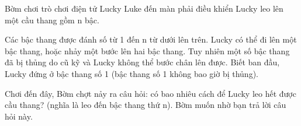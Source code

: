 Bờm chơi trò chơi điện tử Lucky Luke đến màn phải điều khiển Lucky leo lên một cầu thang gồm n bậc.

Các bậc thang được đánh số từ 1 đến n từ dưới lên trên. Lucky có thể đi lên một bậc thang, hoặc nhảy một bước lên hai bậc thang. Tuy nhiên một số bậc thang đã bị thủng do cũ kỹ và Lucky không thể bước chân lên được. Biết ban đầu, Lucky đứng ở bậc thang số 1 (bậc thang số 1 không bao giờ bị thủng).

Chơi đến đây, Bờm chợt nảy ra câu hỏi: có bao nhiêu cách để Lucky leo hết được cầu thang? (nghĩa là leo đến bậc thang thứ n). Bờm muốn nhờ bạn trả lời câu hỏi này.